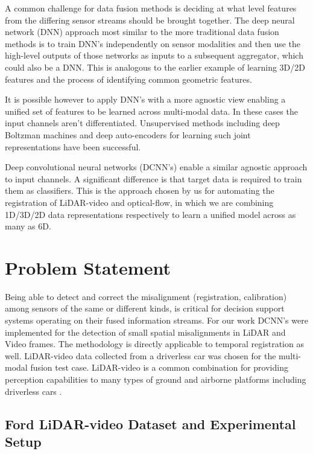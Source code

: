 \documentclass{article}
\begin{document}
A common challenge for data fusion methods is deciding at what level features from the differing sensor streams should be brought together. The deep neural network (DNN) approach most similar to the more traditional data fusion methods is to train DNN's independently on sensor modalities and then use the high-level outputs of those networks as inputs to a subsequent aggregator, which could also be a DNN. This is analogous to the earlier example of learning 3D/2D features and the process of identifying common geometric features. 

It is possible however to apply DNN's with a more agnostic view enabling a unified set of features to be learned across multi-modal data. In these cases the input channels aren't differentiated. Unsupervised methods including deep Boltzman machines and deep auto-encoders for learning such joint representations have been successful.  

Deep convolutional neural networks (DCNN's) enable a similar agnostic approach to input channels. A significant difference is that target data is required to train them as classifiers. This is the approach chosen by us for automating the registration of LiDAR-video and optical-flow, in which we are combining 1D/3D/2D data representations respectively to learn a unified model across as many as 6D. 




\section{Problem Statement} %
\label{sec:problem_statement}

Being able to detect and correct the misalignment (registration, calibration) among sensors of the same or different kinds, is critical for decision support systems operating on their fused information streams. For our work DCNN's were implemented for the detection of small spatial misalignments in LiDAR and Video frames. The methodology is directly applicable to temporal registration as well. LiDAR-video data collected from a driverless car was chosen for the multi-modal fusion test case. LiDAR-video is a common combination for providing perception capabilities to many types of ground and airborne platforms including driverless cars \cite{Thrun2011Googles-dr}. 

\subsection{Ford LiDAR-video Dataset and Experimental Setup} %
\label{sub:ford_lidar_video_dataset_and_experimental_setup}
\end{document}
